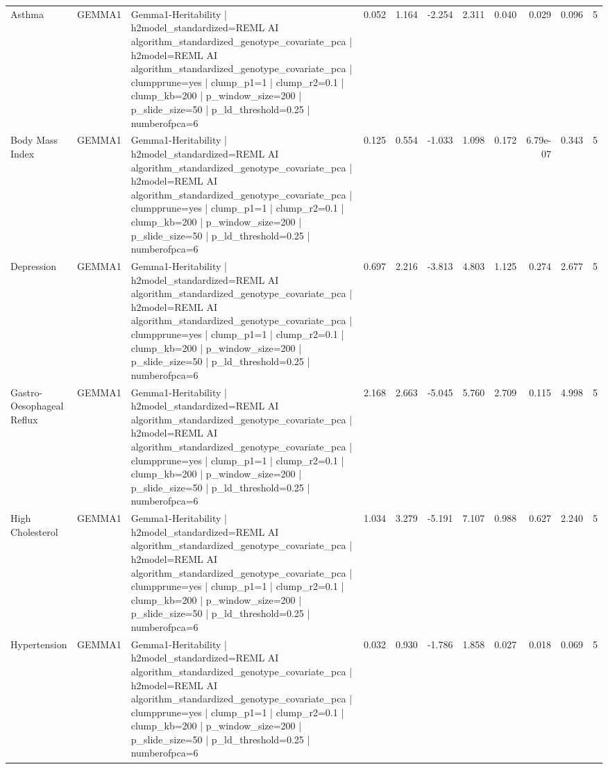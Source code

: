 \begin{landscape}
\begin{longtable}{p{2.4cm}p{1.8cm}p{6.0cm}rrrrrrrr}
Asthma & GEMMA1 & Gemma1-Heritability | h2model\_standardized=REML AI algorithm\_standardized\_genotype\_covariate\_pca | h2model=REML AI algorithm\_standardized\_genotype\_covariate\_pca | clumpprune=yes | clump\_p1=1 | clump\_r2=0.1 | clump\_kb=200 | p\_window\_size=200 | p\_slide\_size=50 | p\_ld\_threshold=0.25 | numberofpca=6 & 0.052 & 1.164 & -2.254 & 2.311 & 0.040 & 0.029 & 0.096 & 5 \\
Body Mass Index & GEMMA1 & Gemma1-Heritability | h2model\_standardized=REML AI algorithm\_standardized\_genotype\_covariate\_pca | h2model=REML AI algorithm\_standardized\_genotype\_covariate\_pca | clumpprune=yes | clump\_p1=1 | clump\_r2=0.1 | clump\_kb=200 | p\_window\_size=200 | p\_slide\_size=50 | p\_ld\_threshold=0.25 | numberofpca=6 & 0.125 & 0.554 & -1.033 & 1.098 & 0.172 & 6.79e-07 & 0.343 & 5 \\
Depression & GEMMA1 & Gemma1-Heritability | h2model\_standardized=REML AI algorithm\_standardized\_genotype\_covariate\_pca | h2model=REML AI algorithm\_standardized\_genotype\_covariate\_pca | clumpprune=yes | clump\_p1=1 | clump\_r2=0.1 | clump\_kb=200 | p\_window\_size=200 | p\_slide\_size=50 | p\_ld\_threshold=0.25 | numberofpca=6 & 0.697 & 2.216 & -3.813 & 4.803 & 1.125 & 0.274 & 2.677 & 5 \\
Gastro-Oesophageal Reflux & GEMMA1 & Gemma1-Heritability | h2model\_standardized=REML AI algorithm\_standardized\_genotype\_covariate\_pca | h2model=REML AI algorithm\_standardized\_genotype\_covariate\_pca | clumpprune=yes | clump\_p1=1 | clump\_r2=0.1 | clump\_kb=200 | p\_window\_size=200 | p\_slide\_size=50 | p\_ld\_threshold=0.25 | numberofpca=6 & 2.168 & 2.663 & -5.045 & 5.760 & 2.709 & 0.115 & 4.998 & 5 \\
High Cholesterol & GEMMA1 & Gemma1-Heritability | h2model\_standardized=REML AI algorithm\_standardized\_genotype\_covariate\_pca | h2model=REML AI algorithm\_standardized\_genotype\_covariate\_pca | clumpprune=yes | clump\_p1=1 | clump\_r2=0.1 | clump\_kb=200 | p\_window\_size=200 | p\_slide\_size=50 | p\_ld\_threshold=0.25 | numberofpca=6 & 1.034 & 3.279 & -5.191 & 7.107 & 0.988 & 0.627 & 2.240 & 5 \\
Hypertension & GEMMA1 & Gemma1-Heritability | h2model\_standardized=REML AI algorithm\_standardized\_genotype\_covariate\_pca | h2model=REML AI algorithm\_standardized\_genotype\_covariate\_pca | clumpprune=yes | clump\_p1=1 | clump\_r2=0.1 | clump\_kb=200 | p\_window\_size=200 | p\_slide\_size=50 | p\_ld\_threshold=0.25 | numberofpca=6 & 0.032 & 0.930 & -1.786 & 1.858 & 0.027 & 0.018 & 0.069 & 5 \\

\end{longtable}
\end{landscape}
